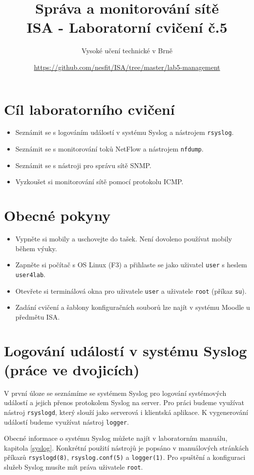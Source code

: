 \documentclass[a4paper,11pt]{article}
\title{Správa a monitorování sítě\\
{\bf\large ISA - Laboratorní cvičení č.5}}
\author{Vysoké učení technické v Brně}
\date{\url{https://github.com/nesfit/ISA/tree/master/lab5-management}}
\begin{document}
{\let\newpage\relax\maketitle} 

\section*{Cíl laboratorního cvičení}
\begin{itemize}
  \item Seznámit se s logováním událostí v systému Syslog a nástrojem {\tt rsyslog}.
  \item Seznámit se s monitorování toků NetFlow a nástrojem {\tt nfdump}.
  \item Seznámit se s nástroji pro správu sítě SNMP.
  \item Vyzkoušet si monitorování sítě pomocí protokolu ICMP.
\end{itemize}

\section*{Obecné pokyny}
\begin{itemize}
  \item Vypněte si mobily a uschovejte do tašek. Není dovoleno používat mobily během výuky. 
  \item Zapněte si počítač s OS Linux (F3) a přihlaste se jako uživatel {\tt user} s heslem {\tt user4lab}.
  \item Otevřete si terminálová okna pro uživatele {\tt user} a uživatele {\tt root} (příkaz {\tt su}).
  \item Zadání cvičení a šablony konfiguračních souborů lze najít v systému Moodle u předmětu ISA.
\end{itemize}

\section{Logování událostí v systému Syslog (práce ve dvojicích)}
V první úloze se seznámíme se systémem Syslog pro logování systémových událostí a jejich přenos protokolem Syslog na server.
Pro práci budeme využívat nástroj {\tt rsyslogd}, který slouží jako serverová i klientská aplikace. K vygenerování událostí budeme využívat nástroj {\tt logger}.

Obecné informace o systému Syslog můžete najít v laboratorním manuálu, kapitola \ref{syslog}. Konkrétní použití nástrojů je popsáno v manuálových stránkách příkazů  {\tt rsyslogd(8)}, {\tt rsyslog.conf(5)} a  {\tt logger(1)}. Pro spuštění a konfiguraci služeb Syslog musíte mít práva uživatele {\tt root}.
\end{document}
